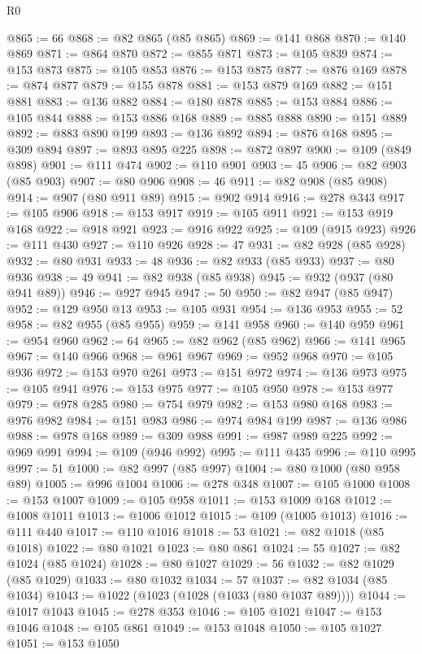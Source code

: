 \begin{lexlean}{R0}
\begin{coremodule}
@865 := 66
@868 := @82 @865 (@85 @865)
@869 := @141 @868
@870 := @140 @869
@871 := @864 @870
@872 := @855 @871
@873 := @105 @839
@874 := @153 @873
@875 := @105 @853
@876 := @153 @875
@877 := @876 @169
@878 := @874 @877
@879 := @155 @878
@881 := @153 @879 @169
@882 := @151 @881
@883 := @136 @882
@884 := @180 @878
@885 := @153 @884
@886 := @105 @844
@888 := @153 @886 @168
@889 := @885 @888
@890 := @151 @889
@892 := @883 @890 @199
@893 := @136 @892
@894 := @876 @168
@895 := @309 @894
@897 := @893 @895 @225
@898 := @872 @897
@900 := @109 (@849 @898)
@901 := @111 @474
@902 := @110 @901
@903 := 45
@906 := @82 @903 (@85 @903)
@907 := @80 @906
@908 := 46
@911 := @82 @908 (@85 @908)
@914 := @907 (@80 @911 @89)
@915 := @902 @914
@916 := @278 @343
@917 := @105 @906
@918 := @153 @917
@919 := @105 @911
@921 := @153 @919 @168
@922 := @918 @921
@923 := @916 @922
@925 := @109 (@915 @923)
@926 := @111 @430
@927 := @110 @926
@928 := 47
@931 := @82 @928 (@85 @928)
@932 := @80 @931
@933 := 48
@936 := @82 @933 (@85 @933)
@937 := @80 @936
@938 := 49
@941 := @82 @938 (@85 @938)
@945 := @932 (@937 (@80 @941 @89))
@946 := @927 @945
@947 := 50
@950 := @82 @947 (@85 @947)
@952 := @129 @950 @13
@953 := @105 @931
@954 := @136 @953
@955 := 52
@958 := @82 @955 (@85 @955)
@959 := @141 @958
@960 := @140 @959
@961 := @954 @960
@962 := 64
@965 := @82 @962 (@85 @962)
@966 := @141 @965
@967 := @140 @966
@968 := @961 @967
@969 := @952 @968
@970 := @105 @936
@972 := @153 @970 @261
@973 := @151 @972
@974 := @136 @973
@975 := @105 @941
@976 := @153 @975
@977 := @105 @950
@978 := @153 @977
@979 := @978 @285
@980 := @754 @979
@982 := @153 @980 @168
@983 := @976 @982
@984 := @151 @983
@986 := @974 @984 @199
@987 := @136 @986
@988 := @978 @168
@989 := @309 @988
@991 := @987 @989 @225
@992 := @969 @991
@994 := @109 (@946 @992)
@995 := @111 @435
@996 := @110 @995
@997 := 51
@1000 := @82 @997 (@85 @997)
@1004 := @80 @1000 (@80 @958 @89)
@1005 := @996 @1004
@1006 := @278 @348
@1007 := @105 @1000
@1008 := @153 @1007
@1009 := @105 @958
@1011 := @153 @1009 @168
@1012 := @1008 @1011
@1013 := @1006 @1012
@1015 := @109 (@1005 @1013)
@1016 := @111 @440
@1017 := @110 @1016
@1018 := 53
@1021 := @82 @1018 (@85 @1018)
@1022 := @80 @1021
@1023 := @80 @861
@1024 := 55
@1027 := @82 @1024 (@85 @1024)
@1028 := @80 @1027
@1029 := 56
@1032 := @82 @1029 (@85 @1029)
@1033 := @80 @1032
@1034 := 57
@1037 := @82 @1034 (@85 @1034)
@1043 := @1022 (@1023 (@1028 (@1033 (@80 @1037 @89))))
@1044 := @1017 @1043
@1045 := @278 @353
@1046 := @105 @1021
@1047 := @153 @1046
@1048 := @105 @861
@1049 := @153 @1048
@1050 := @105 @1027
@1051 := @153 @1050

\end{coremodule}
\end{lexlean}
